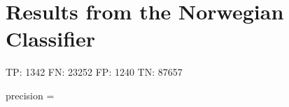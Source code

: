\section{Results from the Norwegian Classifier}

TP: 1342
FN: 23252
FP: 1240
TN: 87657

precision = 